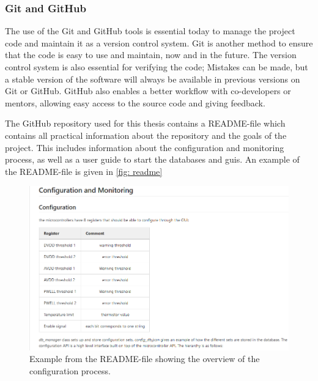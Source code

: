 \documentclass[main.tex]{subfiles}
\begin{document}
\subsubsection{Git and GitHub}

The use of the Git and GitHub tools is essential today to manage the project code and maintain it as a version control system. Git is another method to ensure that the code is easy to use and maintain, now and in the future. The version control system is also essential for verifying the code; Mistakes can be made, but a stable version of the software will always be available in previous versions on Git or GitHub. GitHub also enables a better workflow with co-developers or mentors, allowing easy access to the source code and giving feedback. 

The GitHub repository used for this thesis contains a README-file which contains all practical information about the repository and the goals of the project. This includes information about the configuration and monitoring process, as well as a user guide to start the databases and \gls{gui}s. An example of the README-file is given in \autoref{fig: readme}


\begin{figure}[!ht]
    \centering
    \includegraphics[width=18cm]{images/README_example.png}
    \caption{Example from the README-file showing the overview of the configuration process.}
    \label{fig: readme}
\end{figure}
\FloatBarrier
\end{document}
